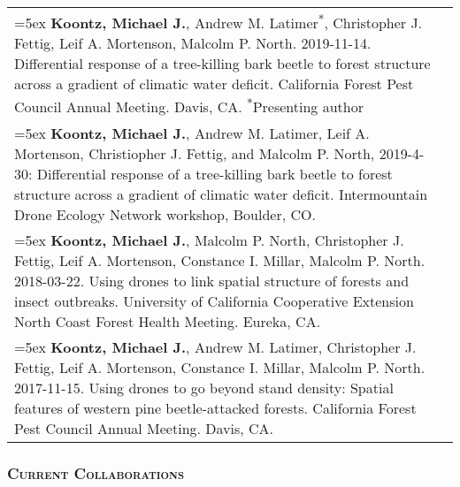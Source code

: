 \documentclass[10pt,english]{article}
\providecommand{\tabularnewline}{\\}
\begin{document}
\renewcommand{\arraystretch}{1.2}
\begin{tabularx}{\textwidth}{@{}>{\raggedright}p{5.25in} >{\raggedleft}X@{}}

\hangindent=5ex \textbf{Koontz, Michael J.}, Andrew M. Latimer\textsuperscript{*}, Christopher J. Fettig, Leif A. Mortenson, Malcolm P. North. 2019-11-14. Differential response of a tree-killing bark beetle to forest structure across a gradient of climatic water deficit. California Forest Pest Council Annual Meeting. Davis, CA. \newline \textsuperscript{*}Presenting author & 2019 \tabularnewline

\hangindent=5ex \textbf{Koontz, Michael J.}, Andrew M. Latimer, Leif A. Mortenson, Christiopher J. Fettig, and Malcolm P. North, 2019-4-30: Differential response of a tree-killing bark beetle to forest structure across a gradient of climatic water deficit. Intermountain Drone Ecology Network workshop, Boulder, CO. & 2019 \tabularnewline

\hangindent=5ex \textbf{Koontz, Michael J.}, Malcolm P. North, Christopher J. Fettig, Leif A. Mortenson, Constance I. Millar, Malcolm P. North. 2018-03-22. Using drones to link spatial structure of forests and insect outbreaks. University of California Cooperative Extension North Coast Forest Health Meeting. Eureka, CA. & 2018 \tabularnewline

\hangindent=5ex \textbf{Koontz, Michael J.}, Andrew M. Latimer, Christopher J. Fettig, Leif A. Mortenson, Constance I. Millar, Malcolm P. North. 2017-11-15. Using drones to go beyond stand density: Spatial features of western pine beetle-attacked forests. California Forest Pest Council Annual Meeting. Davis, CA. & 2017

\end{tabularx}
\vspace{1ex}



%
%


\subsubsection*{\textsc{Current Collaborations}}
\vspace{-0.5ex}
\end{document}
